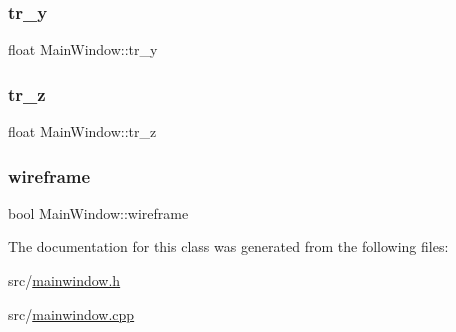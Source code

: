 \mbox{\label{class_main_window_a93fc2a7aa546e29b1ec00c81d278d9c2}} 
\subsubsection{\texorpdfstring{tr\+\_\+y}{tr\_y}}
{\footnotesize\ttfamily float Main\+Window\+::tr\+\_\+y\hspace{0.3cm}{\ttfamily [protected]}}

\mbox{\label{class_main_window_a48e1e4cfdaa4d52f32b46ece5e1e785b}} 
\subsubsection{\texorpdfstring{tr\+\_\+z}{tr\_z}}
{\footnotesize\ttfamily float Main\+Window\+::tr\+\_\+z\hspace{0.3cm}{\ttfamily [protected]}}

\mbox{\label{class_main_window_aa63776c884a82936064be5aabe3da6e8}} 
\subsubsection{\texorpdfstring{wireframe}{wireframe}}
{\footnotesize\ttfamily bool Main\+Window\+::wireframe}



The documentation for this class was generated from the following files\+:\begin{DoxyCompactItemize}
\item 
src/\mbox{\hyperlink{mainwindow_8h}{mainwindow.\+h}}\item 
src/\mbox{\hyperlink{mainwindow_8cpp}{mainwindow.\+cpp}}\end{DoxyCompactItemize}
